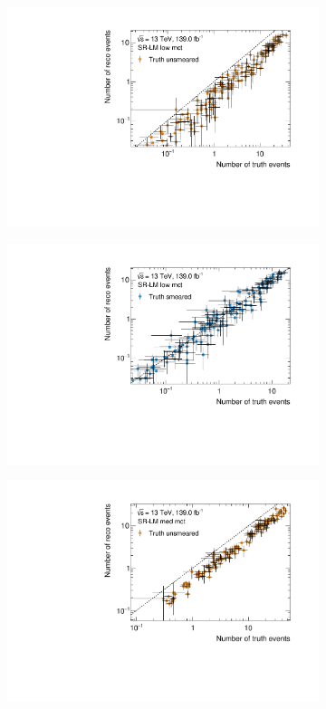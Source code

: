 \begin{figure}
	\centering
	\begin{subfigure}[b]{0.49\linewidth}
		\centering\includegraphics[width=\textwidth]{yields_SR-LM_low_mct_unsmeared}
	\end{subfigure}\hfill
	\begin{subfigure}[b]{0.49\linewidth}
		\centering\includegraphics[width=\textwidth]{yields_SR-LM_low_mct_smeared}
	\end{subfigure}\hfill
	\begin{subfigure}[b]{0.49\linewidth}
		\centering\includegraphics[width=\textwidth]{yields_SR-LM_med_mct_unsmeared}

\end{subfigure}
\end{figure}
